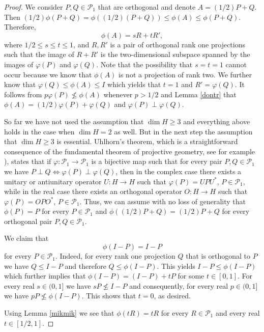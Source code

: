 \documentclass{article}
\begin{document}
\begin{proof}
We consider $P,Q \in \mathcal{P}_1$ that are orthogonal and denote $A = (1/2) P + Q$. Then $(1/2) \phi (P+Q) = \phi ((1/2) (P+Q)) \le \phi (A) \le \phi (P+Q)$. Therefore,
$$
\phi (A) = sR + tR' ,
$$
where $1/2 \le s \le t \le 1$, and $R,R'$ is a pair of orthogonal rank one projections such that the image of $R+R'$ is the two-dimensional subspace spanned by the images  of $\varphi (P)$ and $\varphi (Q)$. Note that the possibility that $s=t=1$ cannot occur because we know that $\phi (A)$ is not a projection of rank two.
We further know that $\varphi (Q) \le \phi (A) \le I$ which yields that $t=1$ and $R' = \varphi (Q)$.
It follows from
$p\varphi (P) \not\le \phi (A)$ whenever $p > 1/2$ and Lemma \ref{dontr} that
$\phi(A) = (1/2)\varphi (P) + \varphi (Q)$ and $\varphi (P) \perp \varphi (Q)$.

So far we have not used the assumption that $\dim H \ge 3$ and everything above holds in the case when $\dim H =2$ as well. But in the next step the assumption that $\dim H \ge 3$ is essential.
Uhlhorn's theorem, which is a straightforward consequence of the fundamental theorem of projective geometry, see for example \cite{Fa}), states that if $\varphi : \mathcal{P}_1 \to \mathcal{P}_1$ is a bijective map such that for every pair $P,Q \in \mathcal{P}_1$ we have $P \perp Q \iff \varphi(P) \perp \varphi (Q)$, then in the complex case there exists a unitary or antiunitary operator $U : H \to H$ such that $\varphi (P) = UPU^\ast$, $P \in \mathcal{P}_1$, while in the real case there exists an orthogonal operator $O : H \to H$ such that $\varphi (P) = OPO^\ast$, $P \in \mathcal{P}_1$. 
Thus, we can assume with no loss of generality that $\phi (P) = P$ for every $P \in \mathcal{P}_1$ and 
$\phi ((1/2) P + Q) = (1/2)P+Q$ for every orthogonal pair $P,Q \in \mathcal{P}_1$. 

We claim that 
\begin{equation}\label{oppos}
\phi (I-P) = I-P
\end{equation}
 for every $P \in \mathcal{P}_1$.
Indeed, for every rank one projection $Q$ that is orthogonal to $P$ we have $Q \le I -P$ and therefore $Q \le \phi (I-P)$. This yields $I-P \le \phi (I-P)$ which further implies that $\phi (I-P) = (I-P) + tP$ for some $t \in [0,1]$. For every real $s \in (0,1]$ we have $sP \not\le I-P$ and consequently, for every real $p \in (0,1]$ we have $pP \not\le \phi (I-P)$. This shows that $t=0$, as desired.

Using Lemma \ref{mikmik} we see
that $\phi (tR) = tR$ for every $R \in \mathcal{P}_1$ and every real $t \in [1/2,1]$. 


\end{proof}
\end{document}
